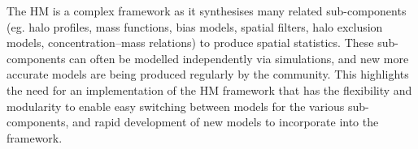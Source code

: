 \documentclass[5p,aas_macros]{elsarticle}
\newcommand{\bd}[1]{\textcolor{purple}{\textbf{[BD: #1]}}}
\begin{document}
The HM is a complex framework as it synthesises many related sub-components (eg. halo profiles, mass functions, bias models, spatial filters, halo exclusion models, concen\-tration--mass relations) to produce spatial statistics. 
These sub-components can often be modelled independently via simulations, and new more accurate models are being produced regularly by the community. 
This highlights the need for an implementation of the HM framework that has the flexibility and modularity to enable easy switching between models for the various sub-components, and rapid development of new models to incorporate into the framework.

\end{document}
